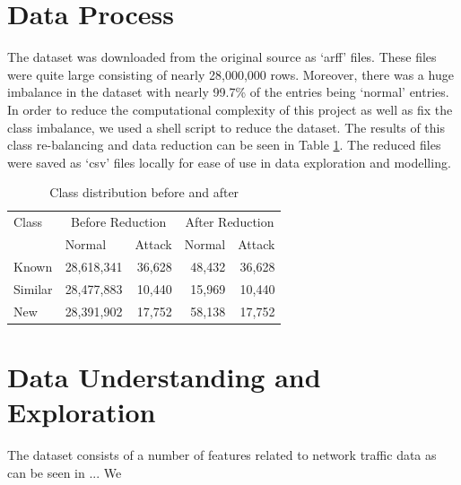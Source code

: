 \section{Data Process}
The dataset was downloaded from the original source as `arff' files. These files were quite large consisting of nearly 28,000,000 rows. Moreover, there was a huge imbalance in the dataset with nearly 99.7\% of the entries being `normal' entries. In order to reduce the computational complexity of this project as well as fix the class imbalance, we used a shell script to reduce the dataset. The results of this class re-balancing and data reduction can be seen in Table \ref{table-class-distribution}. The reduced files were saved as `csv' files locally for ease of use in data exploration and modelling. 

\begin{table}[!htb]
    \centering
    \begin{tabular}{llrrr}
         \toprule
Class&   \multicolumn{2}{c}{Before Reduction}& \multicolumn{2}{c}{After Reduction}\\
&  Normal& Attack& Normal&Attack\\
\midrule
Known & 28,618,341& 36,628& 48,432&36,628\\
Similar & 28,477,883& 10,440& 15,969&10,440\\
New & 28,391,902& 17,752& 58,138&17,752\\
\bottomrule
\end{tabular}
    \caption{Class distribution before and after}
    \label{table-class-distribution}
\end{table}

\section{Data Understanding and Exploration}
The dataset consists of a number of features related to network traffic data as can be seen in ... We 

